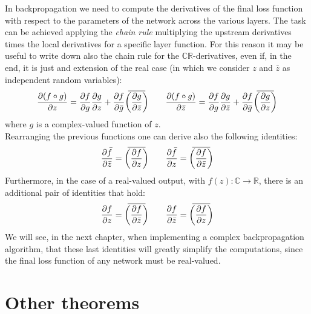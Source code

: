 \documentclass[../main.tex]{subfiles}
\begin{document}
In backpropagation we need to compute the derivatives of the final loss function with respect to the parameters of the network across the various layers. The task can be achieved applying the \textit{chain rule} multiplying the upstream derivatives times the local derivatives for a specific layer function. For this reason it may be useful to write down also the chain rule for the $\mathds{C}\mathds{R}$-derivatives, even if, in the end, it is just and extension of the real case (in which we consider $z$ and $\bar{z}$ as independent random variables):
\begin{equation}
\pdv{(f\circ g)}{z} = \pdv{f}{g}\pdv{g}{z} + \pdv{f}{\bar{g}}\overbar{\left(\pdv{g}{\bar{z}}\right)} \qquad \pdv{(f\circ g)}{\bar{z}} = \pdv{f}{g}\pdv{g}{\bar{z}} + \pdv{f}{\bar{g}}\overbar{\left(\pdv{g}{z}\right)}
\label{eq:CR_derivs_chain_rule}
\end{equation}
where $g$ is a complex-valued function of $z$.\\
Rearranging the previous functions one can derive also the following identities:
\begin{equation}
\pdv{\bar{f}}{\bar{z}} = \overbar{\left(\pdv{f}{z}\right)} \qquad \pdv{\bar{f}}{z} = \overbar{\left(\pdv{f}{\bar{z}}\right)}
\label{eq:CR_calc_identities_1}
\end{equation}
Furthermore, in the case of a real-valued output, with $f(z):\mathds{C}\to\mathds{R}$, there is an additional pair of identities that hold:
\begin{equation}
\pdv{f}{z} = \overbar{\left(\pdv{f}{\bar{z}}\right)} \qquad \pdv{f}{\bar{z}} = \overbar{\left(\pdv{f}{z}\right)}
\label{eq:CR_calc_identities_2}
\end{equation}
We will see, in the next chapter, when implementing a complex backpropagation algorithm, that these last identities will greatly simplify the computations, since the final loss function of any network must be real-valued.


\section{Other theorems}
\end{document}
